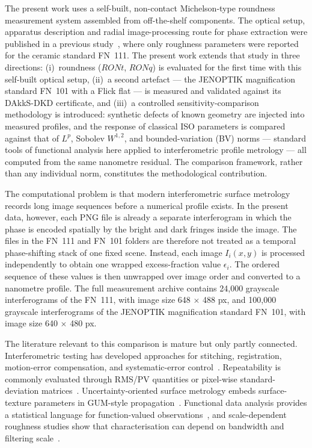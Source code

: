 \documentclass[review]{elsarticle}
\begin{document}
The present work uses a self-built, non-contact Michelson-type roundness measurement system assembled from off-the-shelf components. The optical setup, apparatus description and radial image-processing route for phase extraction were published in a previous study~\cite{kucharski2025radial-0ca}, where only roughness parameters were reported for the ceramic standard FN~111. The present work extends that study in three directions: (i)~roundness ($RONt$, $RONq$) is evaluated for the first time with this self-built optical setup, (ii)~a second artefact — the JENOPTIK magnification standard FN~101 with a Flick flat — is measured and validated against its DAkkS-DKD certificate, and (iii)~a controlled sensitivity-comparison methodology is introduced: synthetic defects of known geometry are injected into measured profiles, and the response of classical ISO parameters is compared against that of $L^p$, Sobolev $W^{1,2}$, and bounded-variation (BV) norms — standard tools of functional analysis here applied to interferometric profile metrology — all computed from the same nanometre residual. The comparison framework, rather than any individual norm, constitutes the methodological contribution.

The computational problem is that modern interferometric surface metrology records long image sequences before a numerical profile exists. In the present data, however, each PNG file is already a separate interferogram in which the phase is encoded spatially by the bright and dark fringes inside the image. The files in the FN~111 and FN~101 folders are therefore not treated as a temporal phase-shifting stack of one fixed scene. Instead, each image $I_i(x,y)$ is processed independently to obtain one wrapped excess-fraction value $\epsilon_i$. The ordered sequence of these values is then unwrapped over image order and converted to a nanometre profile. The full measurement archive contains 24,000 grayscale interferograms of the FN~111, with image size 648 $\times$ 488 px, and 100,000 grayscale interferograms of the JENOPTIK magnification standard FN~101, with image size 640 $\times$ 480 px.

The literature relevant to this comparison is mature but only partly connected. Interferometric testing has developed approaches for stitching, registration, motion-error compensation, and systematic-error control~\cite{Dumas2003134,Chen20061219,Chen20073504,Iacchetta2016,Burge2025}. Repeatability is commonly evaluated through RMS/PV quantities or pixel-wise standard-deviation matrices~\cite{Quan2016,Zhang2018}. Uncertainty-oriented surface metrology embeds surface-texture parameters in GUM-style propagation~\cite{Pappas2023419}. Functional data analysis provides a statistical language for function-valued observations~\cite{Gertheiss2024,Happ2019}, and scale-dependent roughness studies show that characterisation can depend on bandwidth and filtering scale~\cite{Wolf2020,Sanner2022,Zhao2021}.
\end{document}

